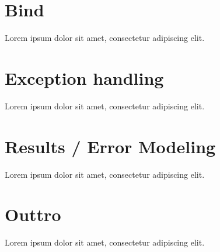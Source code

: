 \documentclass[a4paper,11pt]{article}
\begin{document}
\section{Bind}
Lorem ipsum dolor sit amet, consectetur adipiscing elit.
\section{Exception handling}
Lorem ipsum dolor sit amet, consectetur adipiscing elit.
\section{Results / Error Modeling}
Lorem ipsum dolor sit amet, consectetur adipiscing elit.
\section{Outtro}
Lorem ipsum dolor sit amet, consectetur adipiscing elit.
\end{document}
